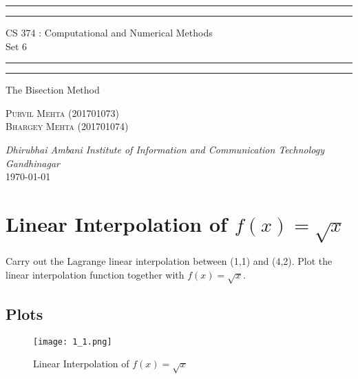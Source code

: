 \documentclass{article}
\begin{document}
\begin{titlepage}
	\centering 
	\scshape
	\vspace*{\baselineskip}
	\rule{\textwidth}{1.6pt}\vspace*{-\baselineskip}\vspace*{2pt}
	\rule{\textwidth}{0.4pt} 
	\vspace{0.75\baselineskip}
	
	{\Large CS 374 : Computational and Numerical Methods \\\vspace{0.75\baselineskip} Set 6}
	\vspace{0.75\baselineskip}
	
	\rule{\textwidth}{0.4pt}\vspace*{-\baselineskip}\vspace{3.2pt} 
	\rule{\textwidth}{1.6pt}
	
	\vspace{2\baselineskip}  
	The Bisection Method
	
	\vspace*{3\baselineskip}
	
	\vspace{0.5\baselineskip} %
	
	{\scshape\large Purvil Mehta (201701073) \\ Bhargey Mehta (201701074) \\} 
	
	\vspace{1\baselineskip} 
	
	\textit{Dhirubhai Ambani Institute of Information and Communication Technology \\ Gandhinagar\\} 
	\vspace*{2\baselineskip}
	\today


\end{titlepage}

\newpage
\tableofcontents
\newpage
\section{Linear Interpolation of $f(x) = \sqrt{x}$}
Carry out the Lagrange linear interpolation between (1,1) and (4,2). Plot the linear interpolation function together with $f(x) = \sqrt{x}$.
\subsection{Plots}
\begin{figure}[!h]
    \centering
    \texttt{[image: 1\_1.png]}
    \caption{Linear Interpolation of $f(x) = \sqrt{x}$}
\end{figure}
\end{document}
